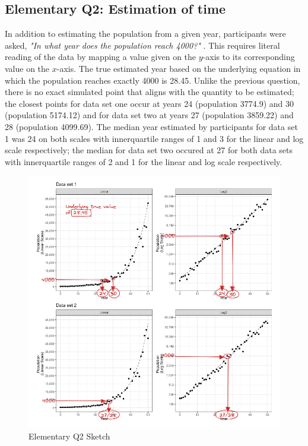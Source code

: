\documentclass[print]{nuthesis}
\begin{document}
\hypertarget{elementary-q2-estimation-of-time}{%
\subsection{Elementary Q2: Estimation of time}\label{elementary-q2-estimation-of-time}}

In addition to estimating the population from a given year, participants were asked, \textit{"In what year does the population reach 4000?"} .
This requires literal reading of the data by mapping a value given on the \(y\)-axis to its corresponding value on the \(x\)-axis.
The true estimated year based on the underlying equation in which the population reaches exactly 4000 is 28.45.
Unlike the previous question, there is no exact simulated point that aligns with the quantity to be estimated; the closest points for data set one occur at years 24 (population 3774.9) and 30 (population 5174.12) and for data set two at years 27 (population 3859.22) and 28 (population 4099.69).
The median year estimated by participants for data set 1 was 24 on both scales with innerquartile ranges of 1 and 3 for the linear and log scale respectively; the median for data set two occured at 27 for both data sets with innerquartile ranges of 2 and 1 for the linear and log scale respectively.

\begin{figure}[tbp]

{\centering \includegraphics[width=1\linewidth,]{images/03-estimation/qe2-sketch} 

}

\caption{Elementary Q2 Sketch}\label{fig:qe2-sketch}
\end{figure}
\end{document}
